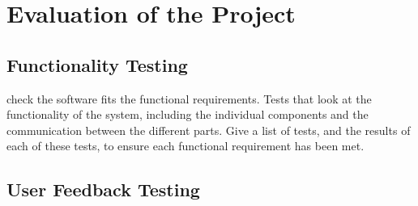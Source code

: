 \section{Evaluation of the Project}

\subsection{Functionality Testing}
	{\color{red}
		check the software fits the functional requirements. Tests that look at the functionality of the system, including the individual components and the communication between the different parts. Give a list of tests, and the results of each of these tests, to ensure each functional requirement has been met.
	}
\subsection{User Feedback Testing}
